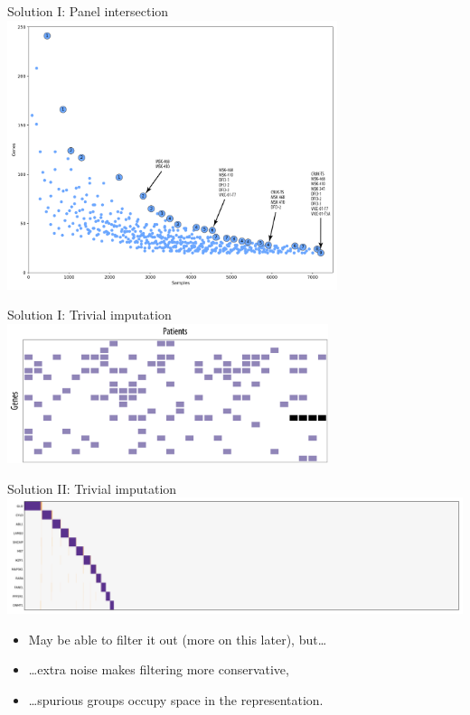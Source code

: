 \documentclass[mathserif]{beamer}
\begin{document}
\begin{frame}{Solution I: Panel intersection}
  \centering
  \includegraphics[width=3.8in]{figures/brca_panels_pareto_annotated.pdf}
\end{frame}

\begin{frame}{Solution I: Trivial imputation}
  \centering
  \includegraphics[width=3.7in]{figures/example1_missing.pdf}
\end{frame}

\begin{frame}{Solution II: Trivial imputation}
  \centering
  \includegraphics[width=\textwidth]{figures/brca_fill.pdf}
  \vspace{1em}
  \begin{itemize}
	\item May be able to filter it out (more on this later), but\ldots
	\vspace{0.5em}
	\item \ldots extra noise makes filtering more conservative,
	\item \ldots spurious groups occupy space in the representation.
\end{itemize}
\end{frame}
\end{document}
